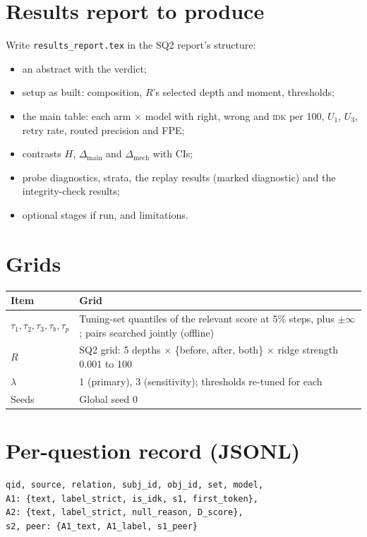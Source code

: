 \documentclass[11pt]{article}
\newcommand{\IDK}{\textsc{idk}}
\begin{document}
\section{Results report to produce}
Write \texttt{results\_report.tex} in the SQ2 report's structure:
\begin{itemize}
  \item an abstract with the verdict;
  \item setup as built: composition, $R$'s selected depth and moment, thresholds;
  \item the main table: each arm $\times$ model with right, wrong and \IDK{} per 100, $U_1$, $U_3$, retry rate,
        routed precision and FPE;
  \item contrasts $H$, $\Delta_{\mathrm{main}}$ and $\Delta_{\mathrm{mech}}$ with CIs;
  \item probe diagnostics, strata, the replay results (marked diagnostic) and the integrity-check results;
  \item optional stages if run, and limitations.
\end{itemize}

\appendix
\section{Grids}
\begin{table}[H]
\centering
\small
\begin{tabularx}{\textwidth}{@{}lL@{}}
\toprule
Item & Grid \\
\midrule
$\tau_1, \tau_2, \tau_3, \tau_b, \tau_p$ & Tuning-set quantiles of the relevant score at 5\% steps, plus $\pm\infty$;
  pairs searched jointly (offline) \\
$R$ & SQ2 grid: 5 depths $\times$ \{before, after, both\} $\times$ ridge strength 0.001 to 100 \\
$\lambda$ & 1 (primary), 3 (sensitivity); thresholds re-tuned for each \\
Seeds & Global seed 0 \\
\bottomrule
\end{tabularx}
\end{table}

\section{Per-question record (JSONL)}
\begin{verbatim}
qid, source, relation, subj_id, obj_id, set, model,
A1: {text, label_strict, is_idk, s1, first_token},
A2: {text, label_strict, null_reason, D_score},
s2, peer: {A1_text, A1_label, s1_peer}
\end{verbatim}
\end{document}
